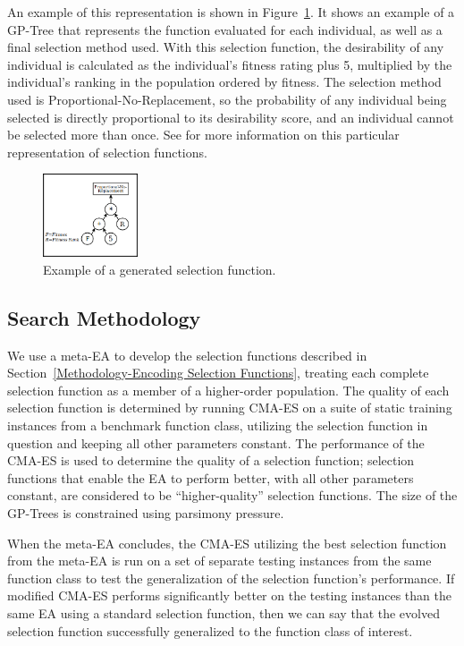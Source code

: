 \documentclass[sigconf]{acmart}
\begin{document}
An example of this representation is shown in Figure~\ref{fig:example_eppsea_nolabel}. It shows an example of a GP-Tree that represents the function evaluated for each individual, as well as a final selection method used. With this selection function, the desirability of any individual is calculated as the individual's fitness rating plus 5, multiplied by the individual's ranking in the population ordered by fitness. The selection method used is Proportional-No-Replacement, so the probability of any individual being selected is directly proportional to its desirability score, and an individual cannot be selected more than once. See \citep{richter2019thesis} for more information on this particular representation of selection functions.

\begin{figure}
	\centering
	\includegraphics[width=0.25\textwidth]{example_eppsea_nolabel}
	\caption{Example of a generated selection function.}
	\label{fig:example_eppsea_nolabel}
\end{figure}

\subsection{Search Methodology}
\label{Methodology-Search Methodology}

We use a meta-EA to develop the selection functions described in Section~\ref{Methodology-Encoding Selection Functions}, treating each complete selection function as a member of a higher-order population. The quality of each selection function is determined by running CMA-ES on a suite of static training instances from a benchmark function class, utilizing the selection function in question and keeping all other parameters constant. The performance of the CMA-ES is used to determine the quality of a selection function; selection functions that enable the EA to perform better, with all other parameters constant, are considered to be ``higher-quality'' selection functions. The size of the GP-Trees is constrained using parsimony pressure.

When the meta-EA concludes, the CMA-ES utilizing the best selection function from the meta-EA is run on a set of separate testing instances from the same function class to test the generalization of the selection function's performance. If modified CMA-ES performs significantly better on the testing instances than the same EA using a standard selection function, then we can say that the evolved selection function successfully generalized to the function class of interest. 
\end{document}
